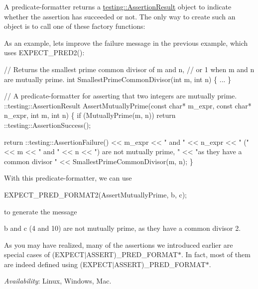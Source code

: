 A predicate-\/formatter returns a {\ttfamily \hyperlink{classtesting_1_1AssertionResult}{testing\+::\+Assertion\+Result}} object to indicate whether the assertion has succeeded or not. The only way to create such an object is to call one of these factory functions\+:

As an example, let\textquotesingle{}s improve the failure message in the previous example, which uses {\ttfamily E\+X\+P\+E\+C\+T\+\_\+\+P\+R\+E\+D2()}\+:


\begin{DoxyCode}
// Returns the smallest prime common divisor of m and n,
// or 1 when m and n are mutually prime.
int SmallestPrimeCommonDivisor(int m, int n) \{ ... \}

// A predicate-formatter for asserting that two integers are mutually prime.
::testing::AssertionResult AssertMutuallyPrime(const char* m\_expr,
                                               const char* n\_expr,
                                               int m,
                                               int n) \{
  if (MutuallyPrime(m, n))
    return ::testing::AssertionSuccess();

  return ::testing::AssertionFailure()
      << m\_expr << " and " << n\_expr << " (" << m << " and " << n
      << ") are not mutually prime, " << "as they have a common divisor "
      << SmallestPrimeCommonDivisor(m, n);
\}
\end{DoxyCode}


With this predicate-\/formatter, we can use


\begin{DoxyCode}
EXPECT\_PRED\_FORMAT2(AssertMutuallyPrime, b, c);
\end{DoxyCode}


to generate the message


\begin{DoxyPre}
b and c (4 and 10) are not mutually prime, as they have a common divisor 2.~\newline

\end{DoxyPre}


As you may have realized, many of the assertions we introduced earlier are special cases of {\ttfamily (E\+X\+P\+E\+C\+T$\vert$\+A\+S\+S\+E\+RT)\+\_\+\+P\+R\+E\+D\+\_\+\+F\+O\+R\+M\+A\+T$\ast$}. In fact, most of them are indeed defined using {\ttfamily (E\+X\+P\+E\+C\+T$\vert$\+A\+S\+S\+E\+RT)\+\_\+\+P\+R\+E\+D\+\_\+\+F\+O\+R\+M\+A\+T$\ast$}.

{\itshape Availability}\+: Linux, Windows, Mac.

